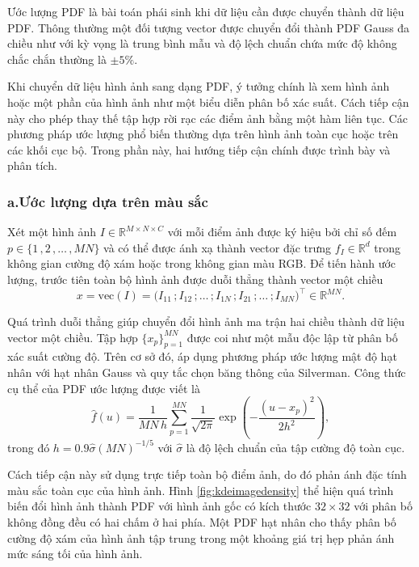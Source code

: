 \documentclass[a4paper,oneside]{book} %
\theoremstyle{plain}
\theoremstyle{plain}
\theoremstyle{nonumberplain}
\begin{document}
Ước lượng PDF là bài toán phái sinh khi dữ liệu cần được chuyển thành dữ liệu PDF. Thông thường một đối tượng vector được chuyển đổi thành PDF Gauss đa chiều như \cite{ren2009naive} với kỳ vọng là trung bình mẫu và độ lệch chuẩn chứa mức độ không chắc chắn thường là $\pm5\%$.

Khi chuyển dữ liệu hình ảnh sang dạng PDF, ý tưởng chính là xem hình ảnh hoặc một phần của hình ảnh như một biểu diễn phân bố xác suất. Cách tiếp cận này cho phép thay thế tập hợp rời rạc các điểm ảnh bằng một hàm liên tục. Các phương pháp ước lượng phổ biến thường dựa trên hình ảnh toàn cục hoặc trên các khối cục bộ. Trong phần này, hai hướng tiếp cận chính được trình bày và phân tích.


\subsubsection{a.\quad Ước lượng dựa trên màu sắc}

Xét một hình ảnh $I \in \mathbb{R}^{M\times N\times C}$ với mỗi điểm ảnh được ký hiệu bởi chỉ số đếm $p \in \{1\,,2\,,\ldots\,,MN\}$ và có thể được ánh xạ thành vector đặc trưng $f_I \in \mathbb{R}^d$ trong không gian cường độ xám hoặc trong không gian màu RGB. Để tiến hành ước lượng, trước tiên toàn bộ hình ảnh được duỗi thẳng thành vector một chiều
$$
x = \mathrm{vec}(I) = \big(I_{11}\,; I_{12}\,; \ldots\,; I_{1N}\,; I_{21}\,; \ldots\,; I_{MN}\big)^\intercal \in \mathbb{R}^{MN}.
$$

Quá trình duỗi thẳng giúp chuyển đổi hình ảnh ma trận hai chiều thành dữ liệu vector một chiều. Tập hợp $\{x_p\}_{p=1}^{MN}$ được coi như một mẫu độc lập từ phân bố xác suất cường độ. Trên cơ sở đó, áp dụng phương pháp ước lượng mật độ hạt nhân với hạt nhân Gauss và quy tắc chọn băng thông của Silverman. Công thức cụ thể của PDF ước lượng được viết là
$$
\hat{f}(u) = \frac{1}{MN\,h}\sum_{p=1}^{MN} \frac{1}{\sqrt{2\pi}} \exp\left(-\frac{(u-x_p)^2}{2h^2}\right),
$$
trong đó $h = 0.9 \hat{\sigma} (MN)^{-1/5}$ với $\hat{\sigma}$ là độ lệch chuẩn của tập cường độ toàn cục.

Cách tiếp cận này sử dụng trực tiếp toàn bộ điểm ảnh, do đó phản ánh đặc tính màu sắc toàn cục của hình ảnh. Hình \ref{fig:kdeimagedensity} thể hiện quá trình biến đổi hình ảnh thành PDF với hình ảnh gốc có kích thước $32\times 32$ với phân bố không đồng đều có hai chấm ở hai phía. Một PDF hạt nhân cho thấy phân bố cường độ xám của hình ảnh tập trung trong một khoảng giá trị hẹp phản ánh mức sáng tối của hình ảnh.
\end{document}
